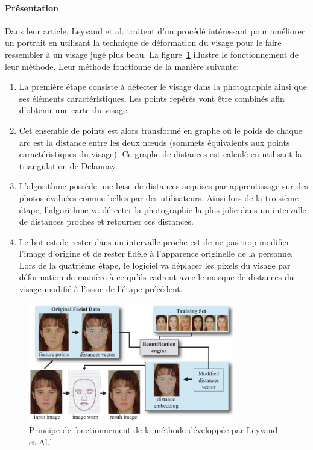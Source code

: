 \documentclass[11pt, french,screen]{report-rd-info}
\begin{document}
\paragraph{Présentation}
Dans leur article, Leyvand et al.\cite{Leyvand2008} traitent d'un procédé intéressant pour améliorer un portrait en utilisant la technique de déformation du visage pour le faire ressembler à un visage jugé plus beau. La figure~\ref{fig:FonctionnemenLeyvand} illustre le fonctionnement de leur méthode. Leur méthode fonctionne de la manière suivante:
\begin{enumerate}
\item La première étape consiste à détecter le visage dans la photographie ainsi que ses éléments caractéristiques. Les points repérés vont être combinés afin d’obtenir une carte du visage.
\item Cet ensemble de points est alors transformé en graphe où le poids de chaque arc est la distance entre les deux nœuds (sommets équivalents aux points caractéristiques du visage). Ce graphe de distances est calculé en utilisant la triangulation de Delaunay.
\item L'algorithme possède une base de distances acquises par apprentissage sur des photos évaluées comme belles par des utilisateurs. Ainsi lors de la troisième étape, l'algorithme va détecter la photographie la plus jolie dans un intervalle de distances proches et retourner ces distances.
\item Le but est de rester dans un intervalle proche est de ne pas trop modifier l'image d'origine et de rester fidèle à l'apparence originelle de la personne.
Lors de la quatrième étape, le logiciel va déplacer les pixels du visage par déformation de manière à ce qu'ils cadrent avec le masque de distances du visage modifié à l’issue de l'étape précédent.
\end{enumerate}
\begin{figure}
	\centering
\includegraphics[width=0.8\textwidth]{Images/ea_algo_datadriven}
	\caption{Principe de fonctionnement de la méthode développée par Leyvand et Al.l\cite{Leyvand2008}}
	\label{fig:FonctionnemenLeyvand}
\end{figure}
\end{document}
